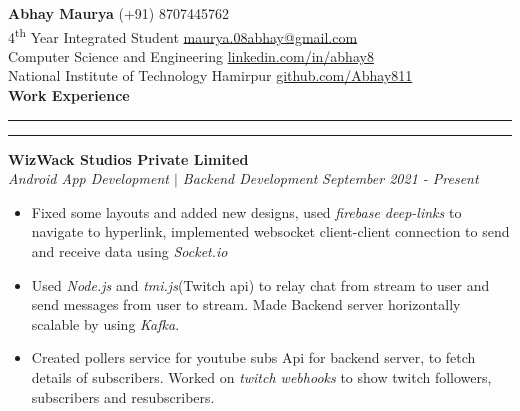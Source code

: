 \documentclass[11pt]{article}
\author{Abhay Maurya}
\begin{document}
	\LARGE{\textbf{Abhay Maurya}}
	\small
	\hfill
        (+91) 8707445762 \\
    4\textsuperscript{th} Year Integrated Student
    \hfill
        \href{mailto:maurya.08abhay@gmail.com}{\color{blue}maurya.08abhay@gmail.com}\\
    \hfill
        Computer Science and Engineering
    \hfill
        \href{https://www.linkedin.com/in/abhay8/}{\color{blue}linkedin.com/in/abhay8}\\
    \hfill
    National Institute of Technology Hamirpur
    \hfill
     	\href{https://github.com/Abhay811}{\color{blue}github.com/Abhay811}\\
    
    \vspace{4pt}
    \textbf{\large{Work Experience}}
    	\vspace{5pt}
    	\hrule \hrule
    	\vspace{4pt}
    	\textbf{WizWack Studios Private Limited}
    	\href{https://drive.google.com/file/d/1GKUMLnI26wRim3qdr-GsE-1DidYjr17D/view?usp=sharing}{\color{blue}}
    	\hfill
    	\\
    	\textit{Android App Development $|$ Backend Development}
    	\hfill
    	\textit{September 2021 - Present}
    	\vspace{-6pt}
    	\begin{itemize}
    		\setlength{\itemsep}{0pt}
        	\setlength{\parskip}{0pt}
        	\setlength{\parsep}{0pt}
    		\item Fixed some layouts and added new designs, used \textit{firebase deep-links} to navigate to hyperlink, implemented websocket client-client connection to send and receive data using \textit{Socket.io}
    		\item Used \textit{Node.js} and \textit{tmi.js}(Twitch api) to relay chat from stream to user and send messages from user to stream. Made Backend server horizontally scalable by using \textit{Kafka}.
    		\item Created pollers service for youtube subs Api for backend server, to fetch details of subscribers. Worked on \textit{twitch webhooks} to show twitch followers, subscribers and resubscribers.\\
    		
    	\end{itemize}
\end{document}
